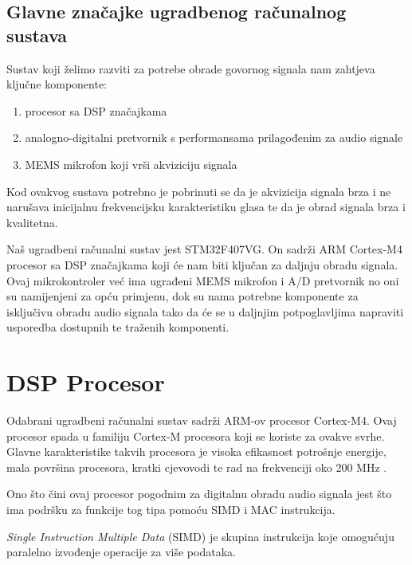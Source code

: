 \documentclass[times, utf8, diplomski]{fer}
\begin{document}
\subsection{Glavne značajke ugradbenog računalnog sustava}
Sustav koji želimo razviti za potrebe obrade govornog signala nam zahtjeva ključne komponente:

\begin{enumerate}
\item procesor sa DSP značajkama
\item analogno-digitalni pretvornik s performansama prilagođenim za audio signale
\item MEMS mikrofon koji vrši akviziciju signala
\end{enumerate}

Kod ovakvog sustava potrebno je pobrinuti se da je akvizicija signala brza i ne narušava inicijalnu frekvencijsku karakteristiku glasa te da je obrad signala brza i kvalitetna. 

Naš ugradbeni računalni sustav jest STM32F407VG. On sadrži ARM Cortex-M4 procesor sa DSP značajkama koji će nam biti ključan za daljnju obradu signala. Ovaj mikrokontroler već ima ugrađeni MEMS mikrofon i A/D pretvornik no oni su namijenjeni za opću primjenu, dok su nama potrebne komponente za isključivu obradu audio signala tako da će se u daljnjim potpoglavljima napraviti usporedba dostupnih te traženih komponenti.

\section{DSP Procesor}
\label{instr}
Odabrani ugradbeni računalni sustav sadrži ARM-ov procesor Cortex-M4. Ovaj procesor spada u familiju Cortex-M procesora koji se koriste za ovakve svrhe. Glavne karakteristike takvih procesora je visoka efikasnost potrošnje energije, mala površina procesora, kratki cjevovodi te rad na frekvenciji oko 200 MHz \citep{cortexm4}.

Ono što čini ovaj procesor pogodnim za digitalnu obradu audio signala jest što ima podršku za funkcije tog tipa pomoću SIMD i MAC instrukcija.

\textit{Single Instruction Multiple Data} (SIMD) je skupina instrukcija koje omogućuju paralelno izvođenje operacije za više podataka.
\end{document}
